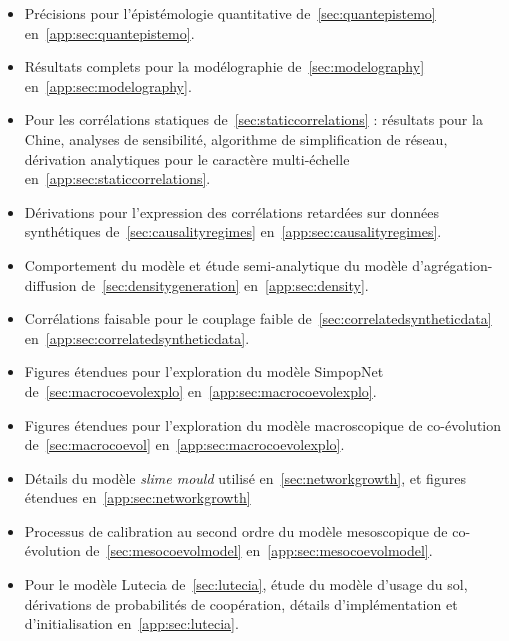 {\begin{itemize}
	\item Précisions pour l'épistémologie quantitative de~\ref{sec:quantepistemo} en~\ref{app:sec:quantepistemo}.
	\item Résultats complets pour la modélographie de~\ref{sec:modelography} en~\ref{app:sec:modelography}.
	\item Pour les corrélations statiques de~\ref{sec:staticcorrelations} : résultats pour la Chine, analyses de sensibilité, algorithme de simplification de réseau, dérivation analytiques pour le caractère multi-échelle en~\ref{app:sec:staticcorrelations}.
	\item Dérivations pour l'expression des corrélations retardées sur données synthétiques de~\ref{sec:causalityregimes} en~\ref{app:sec:causalityregimes}.
	\item Comportement du modèle et étude semi-analytique du modèle d'agrégation-diffusion de~\ref{sec:densitygeneration} en~\ref{app:sec:density}.
	\item Corrélations faisable pour le couplage faible de~\ref{sec:correlatedsyntheticdata} en~\ref{app:sec:correlatedsyntheticdata}.
	\item Figures étendues pour l'exploration du modèle SimpopNet de~\ref{sec:macrocoevolexplo} en~\ref{app:sec:macrocoevolexplo}.
	\item Figures étendues pour l'exploration du modèle macroscopique de co-évolution de~\ref{sec:macrocoevol} en~\ref{app:sec:macrocoevolexplo}.
	\item Détails du modèle \emph{slime mould} utilisé en~\ref{sec:networkgrowth}, et figures étendues en~\ref{app:sec:networkgrowth}
	\item Processus de calibration au second ordre du modèle mesoscopique de co-évolution de~\ref{sec:mesocoevolmodel} en~\ref{app:sec:mesocoevolmodel}.
	\item Pour le modèle Lutecia de~\ref{sec:lutecia}, étude du modèle d'usage du sol, dérivations de probabilités de coopération, détails d'implémentation et d'initialisation en~\ref{app:sec:lutecia}.
\end{itemize}
}



\stars







